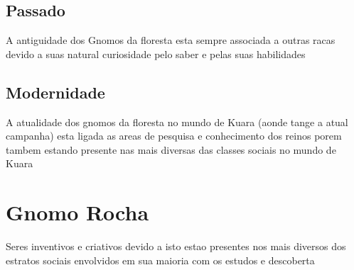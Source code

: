 \documentclass{book}
\begin{document}
\section{Passado}
A antiguidade dos Gnomos da floresta esta sempre associada a outras racas devido a suas 
natural curiosidade pelo saber e pelas suas habilidades 
\section{Modernidade}
A atualidade dos gnomos da floresta no mundo de Kuara (aonde tange a atual campanha) esta
ligada as areas de pesquisa e conhecimento dos reinos porem tambem estando presente nas 
mais diversas das classes sociais no mundo de Kuara 
\chapter{Gnomo Rocha}
Seres inventivos e criativos devido a isto estao presentes nos mais diversos dos estratos 
sociais envolvidos em sua maioria com os estudos e descoberta
\end{document}
